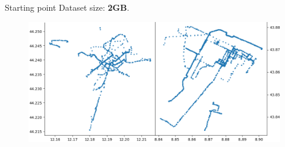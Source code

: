 \documentclass{beamer}
\begin{document}
\begin{frame}{Starting point}
Dataset size: \textbf{2GB}.
\begin{figure}[bt]
	\centering
	\includegraphics[width=\textwidth]{starting-point}
	\label{fig:starting-point}
\end{figure}
\end{frame}
\end{document}
